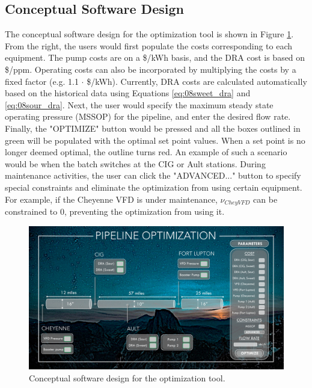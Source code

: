 \subsection{Conceptual Software Design}
The conceptual software design for the optimization tool is shown in Figure \ref{fig:08concept_software}. From the right, the users would first populate the costs corresponding to each equipment.  The pump costs are on a \$/kWh basis, and the DRA cost is based on \$/ppm. Operating costs can also be incorporated by multiplying the costs by a fixed factor (e.g. 1.1 $\cdot$ \$/kWh). Currently, DRA costs are calculated automatically based on the historical data using Equations \ref{eq:08sweet_dra} and \ref{eq:08sour_dra}. Next, the user would specify the maximum steady state operating pressure (MSSOP) for the pipeline, and enter the desired flow rate.  Finally, the "OPTIMIZE" button would be pressed and all the boxes outlined in green will be populated with the optimal set point values.  When a set point is no longer deemed optimal, the outline turns red.  An example of such a scenario would be when the batch switches at the CIG or Ault stations.  During maintenance activities, the user can click the "ADVANCED..." button to specify special constraints and eliminate the optimization from using certain equipment. For example, if the Cheyenne VFD is under maintenance, $\nu_{Chey VFD}$ can be constrained to 0, preventing the optimization from using it.

\begin{figure}[h]
    \centering
    \includegraphics[width=\textwidth]{images/08conceptual_software.pdf}
    \caption{Conceptual software design for the optimization tool.}
    \label{fig:08concept_software}
\end{figure}

